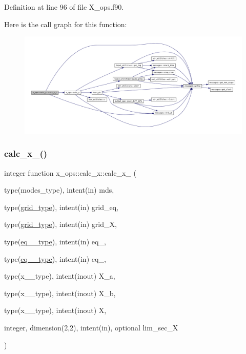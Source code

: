 Definition at line 96 of file X\+\_\+ops.\+f90.

Here is the call graph for this function\+:\nopagebreak
\begin{figure}[H]
\begin{center}
\leavevmode
\includegraphics[width=350pt]{interfacex__ops_1_1calc__x_a837126ca92e7f4d6821261c835b987d4_cgraph}
\end{center}
\end{figure}
\mbox{\label{interfacex__ops_1_1calc__x_a59ee84bcbeb93d7d7fbace7f412138f0}} 
\subsubsection{\texorpdfstring{calc\+\_\+x\+\_()}{calc\_x\_2()}}
{\footnotesize\ttfamily integer function x\+\_\+ops\+::calc\+\_\+x\+::calc\+\_\+x\+\_ (\begin{DoxyParamCaption}\item[{type(modes\+\_\+type), intent(in)}]{mds,  }\item[{type(\hyperlink{structgrid__vars_1_1grid__type}{grid\+\_\+type}), intent(in)}]{grid\+\_\+eq,  }\item[{type(\hyperlink{structgrid__vars_1_1grid__type}{grid\+\_\+type}), intent(in)}]{grid\+\_\+X,  }\item[{type(\hyperlink{structeq__vars_1_1eq__1__type}{eq\+\_\+1\+\_\+type}), intent(in)}]{eq\+\_,  }\item[{type(\hyperlink{structeq__vars_1_1eq__2__type}{eq\+\_\+2\+\_\+type}), intent(in)}]{eq\+\_,  }\item[{type(x\+\_\+1\+\_\+type), intent(inout)}]{X\+\_\+a,  }\item[{type(x\+\_\+1\+\_\+type), intent(inout)}]{X\+\_\+b,  }\item[{type(x\+\_\+2\+\_\+type), intent(inout)}]{X,  }\item[{integer, dimension(2,2), intent(in), optional}]{lim\+\_\+sec\+\_\+X }\end{DoxyParamCaption})}



